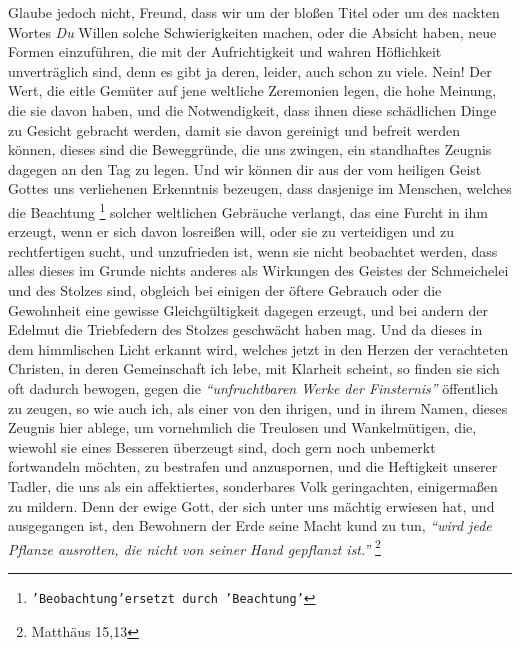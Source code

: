 Glaube jedoch nicht, Freund, dass wir um der bloßen Titel oder um des nackten
Wortes \textit{Du} Willen solche Schwierigkeiten machen, oder die Absicht haben,
neue
Formen einzuführen, die mit der Aufrichtigkeit und wahren Höflichkeit
unverträglich sind, denn es gibt ja deren, leider, auch schon zu viele. Nein!
Der Wert, die eitle Gemüter auf jene weltliche Zeremonien legen, die hohe
Meinung, die sie davon haben, und die Notwendigkeit, dass ihnen diese
schädlichen Dinge zu Gesicht gebracht werden, damit sie davon gereinigt und
befreit werden können, dieses sind die Beweggründe, die uns zwingen, ein
standhaftes Zeugnis dagegen an den Tag zu legen. Und wir können
dir aus der vom
heiligen Geist Gottes uns verliehenen Erkenntnis bezeugen, dass dasjenige im
Menschen, welches die Beachtung
\footnote{\texttt{'Beobachtung'ersetzt durch 'Beachtung'}} solcher weltlichen
Gebräuche verlangt, das
eine Furcht in ihm erzeugt, wenn er sich davon losreißen will, oder sie zu
verteidigen und zu rechtfertigen sucht, und unzufrieden ist, wenn sie nicht
beobachtet werden, dass alles dieses im Grunde nichts anderes als Wirkungen des
Geistes der Schmeichelei und des Stolzes sind, obgleich bei einigen der öftere
Gebrauch oder die Gewohnheit eine gewisse Gleichgültigkeit dagegen erzeugt, und
bei andern der Edelmut die Triebfedern des Stolzes geschwächt haben mag. Und
da dieses in dem himmlischen Licht erkannt wird, welches jetzt in den Herzen
der verachteten Christen, in deren Gemeinschaft ich lebe, mit Klarheit scheint,
so finden sie sich oft dadurch bewogen, gegen die \textit{"`unfruchtbaren Werke
der
Finsternis"'} öffentlich zu zeugen, so wie auch ich, als einer
von den ihrigen,
und in ihrem Namen, dieses Zeugnis hier ablege, um vornehmlich die Treulosen und
Wankelmütigen, die, wiewohl sie eines Besseren überzeugt sind, doch gern noch
unbemerkt fortwandeln möchten, zu bestrafen und anzuspornen, und die Heftigkeit
unserer Tadler, die uns als ein affektiertes, sonderbares Volk geringachten,
einigermaßen zu mildern. Denn der ewige Gott, der sich unter uns mächtig
erwiesen hat, und ausgegangen ist, den Bewohnern der Erde seine Macht kund zu
tun,
\textit{"`wird jede Pflanze ausrotten, die nicht von seiner Hand gepflanzt
ist."'}
\footnote{Matthäus 15,13}

\medskip


